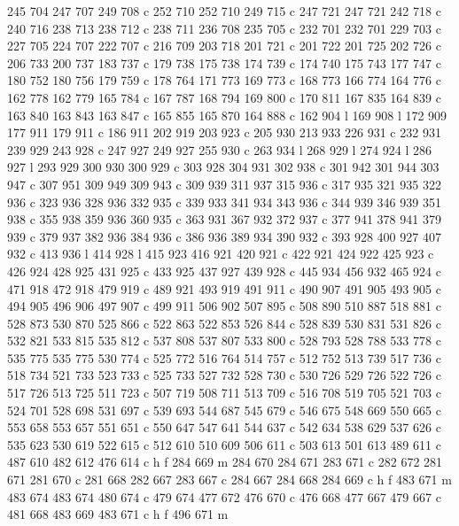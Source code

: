 {{   245 704 247 707 249 708 c
   252 710 252 710 249 715 c
   247 721 247 721 242 718 c
   240 716 238 713 238 712 c
   238 711 236 708 235 705 c
   232 701 232 701 229 703 c
   227 705 224 707 222 707 c
   216 709 203 718 201 721 c
   201 722 201 725 202 726 c
   206 733 200 737 183 737 c
   179 738 175 738 174 739 c
   174 740 175 743 177 747 c
   180 752 180 756 179 759 c
   178 764 171 773 169 773 c
   168 773 166 774 164 776 c
   162 778 162 779 165 784 c
   167 787 168 794 169 800 c
   170 811 167 835 164 839 c
   163 840 163 843 163 847 c
   165 855 165 870 164 888 c
   162 904 l
   169 908 l
   172 909 177 911 179 911 c
   186 911 202 919 203 923 c
   205 930 213 933 226 931 c
   232 931 239 929 243 928 c
   247 927 249 927 255 930 c
   263 934 l
   268 929 l
   274 924 l
   286 927 l
   293 929 300 930 300 929 c
   303 928 304 931 302 938 c
   301 942 301 944 303 947 c
   307 951 309 949 309 943 c
   309 939 311 937 315 936 c
   317 935 321 935 322 936 c
   323 936 328 936 332 935 c
   339 933 341 934 343 936 c
   344 939 346 939 351 938 c
   355 938 359 936 360 935 c
   363 931 367 932 372 937 c
   377 941 378 941 379 939 c
   379 937 382 936 384 936 c
   386 936 389 934 390 932 c
   393 928 400 927 407 932 c
   413 936 l
   414 928 l
   415 923 416 921 420 921 c
   422 921 424 922 425 923 c
   426 924 428 925 431 925 c
   433 925 437 927 439 928 c
   445 934 456 932 465 924 c
   471 918 472 918 479 919 c
   489 921 493 919 491 911 c
   490 907 491 905 493 905 c
   494 905 496 906 497 907 c
   499 911 506 902 507 895 c
   508 890 510 887 518 881 c
   528 873 530 870 525 866 c
   522 863 522 853 526 844 c
   528 839 530 831 531 826 c
   532 821 533 815 535 812 c
   537 808 537 807 533 800 c
   528 793 528 788 533 778 c
   535 775 535 775 530 774 c
   525 772 516 764 514 757 c
   512 752 513 739 517 736 c
   518 734 521 733 523 733 c
   525 733 527 732 528 730 c
   530 726 529 726 522 726 c
   517 726 513 725 511 723 c
   507 719 508 711 513 709 c
   516 708 519 705 521 703 c
   524 701 528 698 531 697 c
   539 693 544 687 545 679 c
   546 675 548 669 550 665 c
   553 658 553 657 551 651 c
   550 647 547 641 544 637 c
   542 634 538 629 537 626 c
   535 623 530 619 522 615 c
   512 610 510 609 506 611 c
   503 613 501 613 489 611 c
   487 610 482 612 476 614 c
   h f
   284 669 m
   284 670 284 671 283 671 c
   282 672 281 671 281 670 c
   281 668 282 667 283 667 c
   284 667 284 668 284 669 c
   h f
   483 671 m
   483 674 483 674 480 674 c
   479 674 477 672 476 670 c
   476 668 477 667 479 667 c
   481 668 483 669 483 671 c
   h f
   496 671 m
}}
